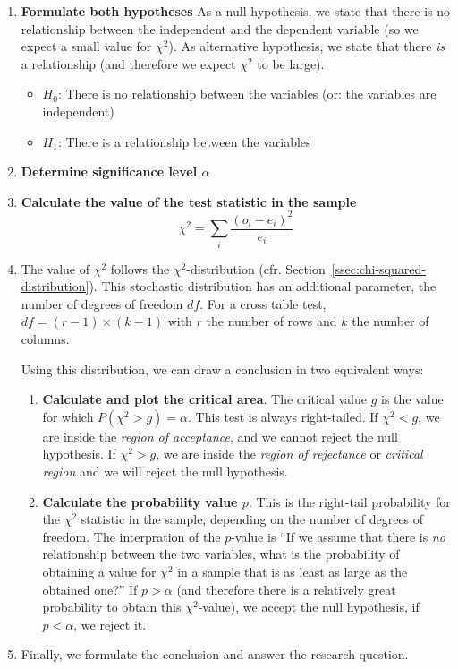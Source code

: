 \begin{enumerate}
  \item \textbf{Formulate both hypotheses}
  As a null hypothesis, we state that there is no relationship between the independent and the dependent variable (so we expect a small value for $\chi^2$).
  As alternative hypothesis, we state that there \emph{is} a relationship (and therefore we expect $\chi^2$ to be large).
  \begin{itemize}
    \item $H_{0}$: There is no relationship between the variables (or: the variables are independent)
    \item $H_{1}$: There is a relationship between the variables
  \end{itemize}

  \item \textbf{Determine significance level $\alpha$}
  
  \item \textbf{Calculate the value of the test statistic in the sample}
  \[ \chi^{2} = \sum_{i} \frac{(o_{i} - e_{i})^{2}}{e_{i}} \]

  \item The value of $\chi^2$ follows the $\chi^2$-distribution (cfr. Section~\ref{ssec:chi-squared-distribution}). This stochastic distribution has an additional parameter, the number of degrees of freedom $df$. For a cross table test, $df = (r - 1) \times (k - 1)$ with $r$ the number of rows and $k$ the number of columns.

  Using this distribution, we can draw a conclusion in two equivalent ways:
  \begin{enumerate}
    \item \textbf{Calculate and plot the critical area}. The critical value $g$ is the value for which $P(\chi^2 > g) = \alpha$. This test is always right-tailed. If $\chi^2 < g$, we are inside the \emph{region of acceptance}, and we cannot reject the null hypothesis. If $\chi^2 > g$, we are inside the \emph{region of rejectance} or \emph{critical region} and we will reject the null hypothesis.
    \item \textbf{Calculate the probability value $p$}. This is the right-tail probability for the $\chi^2$ statistic in the sample, depending on the number of degrees of freedom. The interpration of the $p$-value is ``If we assume that there is \emph{no} relationship between the two variables, what is the probability of obtaining a value for $\chi^2$ in a sample that is as least as large as the obtained one?'' If $p > \alpha$ (and therefore there is a relatively great probability to obtain this $\chi^2$-value), we accept the null hypothesis, if $p < \alpha$, we reject it.
  \end{enumerate}

  \item Finally, we formulate the conclusion and answer the research question.
\end{enumerate}  

